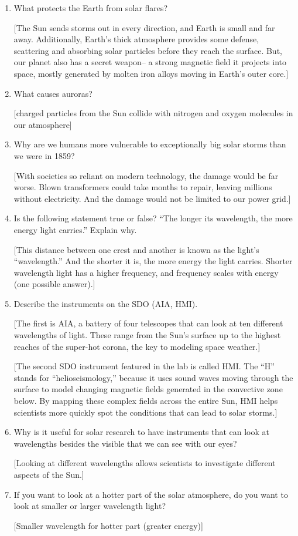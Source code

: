 \documentclass[11pt]{article}%
\begin{document}
\begin{enumerate}
\item What protects the Earth from solar flares?

[The Sun sends storms out in every direction, and Earth is small and far away. Additionally, Earth’s thick atmosphere provides some defense, scattering and absorbing solar particles before they reach the surface. But, our planet also has a secret weapon-- a strong magnetic field it projects into space, mostly generated by molten iron alloys moving in Earth’s outer core.]

\item What causes auroras?

[charged particles from the Sun collide with nitrogen and oxygen molecules in our atmosphere]

\item Why are we humans more vulnerable to exceptionally big solar storms than we were in 1859?

[With societies so reliant on modern technology, the damage would be far worse. Blown transformers could take months to repair, leaving millions without electricity. And the damage would not be limited to our power grid.]

\item Is the following statement true or false? ``The longer its wavelength, the more energy light carries.'' Explain why.

[This distance between one crest and another is known as the light’s “wavelength.” And the shorter it is, the more energy the light carries. Shorter wavelength light has a higher frequency, and frequency scales with energy (one possible answer).]

\item Describe the instruments on the SDO (AIA, HMI).

[The first is AIA, a battery of four telescopes that can look at ten different wavelengths of light. These range from the Sun’s surface up to the highest reaches of the super-hot corona, the key to modeling space weather.]

[The second SDO instrument featured in the lab is called HMI. The “H” stands for “helioseismology,” because it uses sound waves moving through the surface to model changing magnetic fields generated in the convective zone below. By mapping these complex fields across the entire Sun, HMI helps scientists more quickly spot the conditions that can lead to solar storms.]

\item Why is it useful for solar research to have instruments that can look at wavelengths besides the visible that we can see with our eyes?

[Looking at different wavelengths allows scientists to investigate different aspects of the Sun.]

\item If you want to look at a hotter part of the solar atmosphere, do you want to look at smaller or larger wavelength light?

[Smaller wavelength for hotter part (greater energy)]
\end{enumerate}
\end{document}
